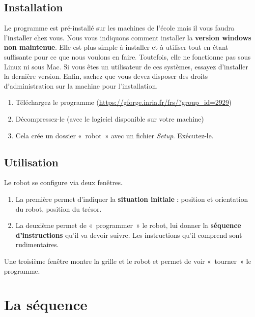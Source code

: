	\subsection{Installation}

		Le programme est pré-installé sur les machines de
		l'école mais il vous faudra
		l'installer chez vous. Nous vous indiquons comment
		installer la \textbf{version windows non maintenue}. Elle est plus
		simple à installer et à utiliser tout en étant suffisante pour ce que
		nous voulons en faire. Toutefois, elle ne fonctionne pas sous Linux ni
		sous Mac. Si vous êtes un utilisateur de ces systèmes, essayez
		d'installer la dernière version. Enfin, sachez que
		vous devez disposer des droits d'administration sur la
		machine pour l'installation.

		\begin{enumerate}
		\item
			Téléchargez le programme
			(\url{https://gforge.inria.fr/frs/?group\_id=2929})
		\item 
			Décompressez-le (avec le logiciel disponible sur votre machine)
		\item
			Cela crée un dossier «~robot~» avec un fichier \textit{Setup}.
			Exécutez-le.
		\end{enumerate}

	\subsection{Utilisation}

		Le robot se configure via deux fenêtres.

		\begin{enumerate}
		\item 
			La première permet d'indiquer la \textbf{situation
			initiale} : position et orientation du robot, position du trésor.
		\item 
			La deuxième permet de «~programmer~» le robot, lui donner la
			\textbf{séquence d'instructions}
			qu'il va devoir suivre. Les instructions
			qu'il comprend sont rudimentaires. 
		\end{enumerate}

		Une troisième fenêtre montre la grille et le robot et permet de voir
		«~tourner~» le programme.

\section{La séquence}

